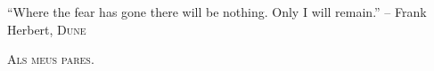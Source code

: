 

\begin{center}
    \vspace{2cm}
    ``Where the fear has gone there will be nothing. Only I will remain.''
    \newline
    -- Frank Herbert, \textsc{Dune}


    \vspace{3cm}
    \textsc{Als meus pares.}
\end{center}

